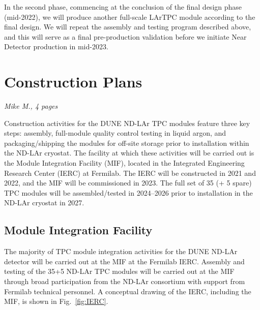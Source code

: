 In the second phase, commencing at the conclusion of the final design phase (mid-2022), we will produce another full-scale LArTPC module according to the final design.  
We will repeat the assembly and testing program described above, and this will serve as a final pre-production validation before we initiate Near Detector production in mid-2023.

\section{Construction Plans}
\label{sec:lartpc-construc}
{\it Mike M., 4 pages}

Construction activities for the DUNE ND-LAr TPC modules feature three key steps: assembly, full-module quality control testing in liquid argon, and packaging/shipping the modules for off-site storage prior to installation within the ND-LAr cryostat.  The facility at which these activities will be carried out is the Module Integration Facility (MIF), located in the Integrated Engineering Research Center (IERC) at Fermilab.  The IERC will be constructed in 2021 and 2022, and the MIF will be commissioned in 2023.  The full set of 35 (+ 5 spare) TPC modules will be assembled/tested in 2024--2026 prior to installation in the ND-LAr cryostat in 2027.

\subsection{Module Integration Facility}

The majority of TPC module integration activities for the DUNE ND-LAr detector will be carried out at the MIF at the Fermilab IERC.  Assembly and testing of the 35+5 ND-LAr TPC modules will be carried out at the MIF through broad participation from the ND-LAr consortium with support from Fermilab technical personnel.  A conceptual drawing of the IERC, including the MIF, is shown in Fig.~\ref{fig:IERC}.

